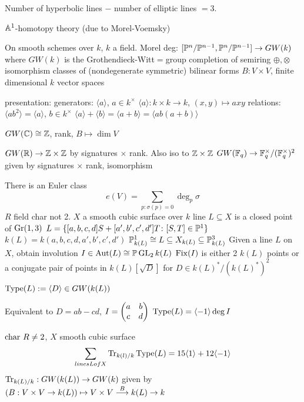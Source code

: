 \begin{thm}
Number of hyperbolic lines $-$ number of elliptic lines $=3$.
\end{thm}


$\A^1$-homotopy theory (due to Morel-Voemsky)

On smooth schemes over $k$, $k$ a field.
Morel deg: $[\P^n/\P^{n-1}, \P^n/\P^{n-1}] \to G W(k)$
where $GW(k)$ is the Grothendieck-Witt$=$group completion of semiring $\oplus,\otimes$ isomorphism classes of (nondegenerate symmetric) bilinear forms $B: V \times V$, finite dimensional $k$ vector spaces

presentation:
generators: $\langle a \rangle$, $a \in k^\times$
$\langle a \rangle: k \times k \to k$, $(x,y) \mapsto axy$
relations: $\langle ab^2 \rangle= \langle a \rangle$, $b \in k^\times$
$\langle a \rangle + \langle b \rangle= \langle a+b \rangle = \langle ab(a+b) \rangle$


\begin{ex}
$GW(\C) \cong \Z$, rank, $B \mapsto \dim V$
\end{ex}


\begin{ex}
$GW(\R) \to \Z \times \Z$ by signatures $\times$ rank. Also iso to $\Z \times \Z$
$GW(\F_q) \to \F_q^\times/(\F_q^\times)^2$ given by signatures $\times$ rank, isomorphism
\end{ex}


There is an Euler class
	\[
	e(V)= \sum_{p: \sigma(p)=0} \deg_p \sigma
	\]
$R$ field char not 2. $X$ a smooth cubic surface over $k$
line $L \subseteq X$ is a closed point of $\gr(1,3)$
$L= \{ [a,b,c,d]S+[a',b',c',d'] T \colon [S,T] \in \P^1\}$
$k(L)= k(a,b,c,d,a',b',c',d')$
$\P_{k(L)}^1 \cong L \subseteq X_{k(L)} \subseteq \P_{k(L)}^3$
Given a line $L$ on $X$, obtain involution $I \in \Aut(L) \cong \P \gl_2 k(L)$
$\fix(I)$ is either 2 $k(L)$ points or a conjugate pair of points in $k(L)[\sqrt{D}]$ for $D \in k(L)^*/(k(L)^*)^2$

\begin{dfn}
$\typ(L):= \langle D \rangle \in GW(k(L))$
\end{dfn}

Equivalent to $D= ab-cd$, $I= \two{a}{b}{c}{d}$
$\typ(L)= \langle -1 \rangle \deg I$

\begin{thm}[Kass-W.]
$\char R \neq 2$, $X$ smooth cubic surface
	\[
	\sum_{lines L of X} \tr_{k(l)/k} \typ(L)= 15 \langle 1 \rangle + 12 \langle -1 \rangle
	\]
$\tr_{k(L)/k}: GW(k(L)) \to GW(k)$ given by $(B: V \times V \to k(L)) \mapsto V \times V \ma{B} k(L) \to k$
\end{thm}


